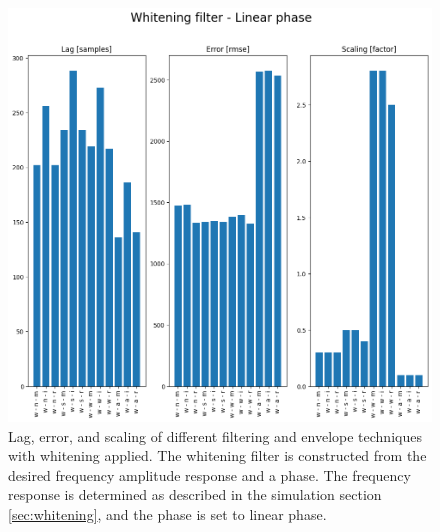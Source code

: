 \begin{figure}[h!t]
	\begin{center}
		\includegraphics[width=1.0\columnwidth]{images/result_whitening_linearphase.png}
	\end{center}
	\caption{Lag, error, and scaling of different filtering and envelope techniques with whitening applied. The whitening filter is constructed from the desired frequency amplitude response and a phase. The frequency response is determined as described in the simulation section \ref{sec:whitening}, and the phase is set to linear phase.}
	\label{fig:result_whitening_sourcephase}
\end{figure}

